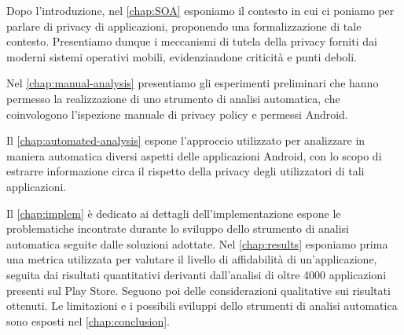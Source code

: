 Dopo l'introduzione, nel \autoref{chap:SOA} esponiamo il contesto in cui ci poniamo per parlare di privacy di applicazioni, proponendo una formalizzazione di tale contesto. Presentiamo dunque i meccanismi di tutela della privacy forniti dai moderni sistemi operativi mobili, evidenziandone criticità e punti deboli.

Nel \autoref{chap:manual-analysis} presentiamo gli esperimenti preliminari che hanno permesso la realizzazione di uno strumento di analisi automatica, che coinvologono l'ispezione manuale di privacy policy e permessi Android.

Il \autoref{chap:automated-analysis} espone l'approccio utilizzato per analizzare in maniera automatica diversi aspetti delle applicazioni Android, con lo scopo di estrarre informazione circa il rispetto della privacy degli utilizzatori di tali applicazioni.

Il \autoref{chap:implem} è dedicato ai dettagli dell'implementazione espone le problematiche incontrate durante lo sviluppo dello strumento di analisi automatica seguite dalle soluzioni adottate. Nel \autoref{chap:results} esponiamo prima una metrica utilizzata per valutare il livello di affidabilità di un'applicazione, seguita dai risultati quantitativi derivanti dall'analisi di oltre 4000 applicazioni presenti sul Play Store. Seguono poi delle considerazioni qualitative sui risultati ottenuti. Le limitazioni e i possibili sviluppi dello strumenti di analisi automatica sono esposti nel \autoref{chap:conclusion}.